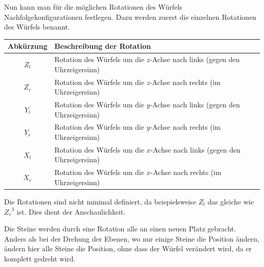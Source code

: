\documentclass[12pt,a4paper, usenames, dvipsnames]{article}
\begin{document}
Nun kann man für die möglichen Rotationen des Würfels Nachfolgekonfigurationen festlegen. 
Dazu werden zuerst die einzelnen Rotationen des Würfels benannt. 

\begin{tabular}{cl}
\toprule
\textbf{Abkürzung} & \textbf{Beschreibung der Rotation} \\
\midrule
$Z_l$ & Rotation des Würfels um die $z$-Achse nach links (gegen den Uhrzeigersinn)\\

$Z_r$ & Rotation des Würfels um die $z$-Achse nach rechts (im Uhrzeigersinn)  \\

$Y_l$ & Rotation des Würfels um die $y$-Achse nach links (gegen den Uhrzeigersinn)\\

$Y_r$ & Rotation des Würfels um die $y$-Achse nach rechts (im Uhrzeigersinn)  \\

$X_l$ & Rotation des Würfels um die $x$-Achse nach links (gegen den Uhrzeigersinn)\\

$X_r$ & Rotation des Würfels um die $x$-Achse nach rechts (im Uhrzeigersinn) \\
\bottomrule
\end{tabular} 


Die Rotationen sind nicht minimal definiert, da beispielsweise $Z_l$ das gleiche wie ${Z_r}^3$ ist. Dies dient der Anschaulichkeit. 

Die Steine werden durch eine Rotation alle an einen neuen Platz gebracht. Anders als bei der Drehung der Ebenen, wo nur einige Steine die Position ändern, ändern hier alle Steine die Position, ohne dass der Würfel verändert wird, da er komplett gedreht wird. 
\end{document}
